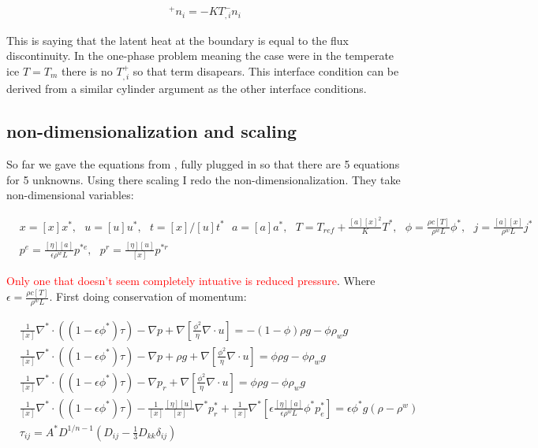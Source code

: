 \documentclass[a4paper,12pt]{article}
\begin{document}
\begin{align}
  [\rho^wL\phi(u_i-w_i) + \rho^wLj_i - KT_{,i}]^+ n_i = -KT_{,i}^- n_i
\end{align}

This is saying that the latent heat at the boundary is equal to the flux discontinuity. In the one-phase problem meaning the case were in the temperate ice $T=T_m$ there is no $T_{,i}^+$ so that term disapears. This interface condition can be derived from a similar cylinder argument as the other interface conditions. \cite{Andreucci}

\subsection{non-dimensionalization and scaling}

So far we gave the equations from \cite{schoof_2016}, fully plugged in so that there are 5 equations for 5 unknowns. Using there scaling I redo the non-dimensionalization. They take non-dimensional variables:

\begin{align*}
  & x = [x]x^*, ~~~ u = [u]u^*, ~~~ t = [x]/[u]t^* ~~~ a = [a]a^*, ~~~ T = T_{ref} + \frac{[a][x]^2}{K}T^*, ~~~ \phi = \frac{\rho c [T]}{\rho^w L}\phi^*, ~~~ j = \frac{[a][x]}{\rho^w L}j^*\\
  & p^e = \frac{[\eta][a]}{\epsilon\rho^wL}p^{*e}, ~~~ p^r = \frac{[\eta][u]}{[x]}p^{*r}
\end{align*}
  
\textcolor{red}{Only one that doesn't seem completely intuative is reduced pressure}. Where $\epsilon = \frac{\rho c [T]}{\rho^w L}$. First doing conservation of momentum:

\begin{align*}
  & \frac{1}{[x]}\nabla^* \cdot ((1-\epsilon\phi^*)\tau) - \nabla p + \nabla\left[\frac{\phi^2}{\eta}\nabla \cdot u\right] = -(1 - \phi) \rho g - \phi \rho_w g\\
  & \frac{1}{[x]}\nabla^* \cdot ((1-\epsilon\phi^*)\tau) - \nabla p + \rho g + \nabla\left[\frac{\phi^2}{\eta}\nabla \cdot u\right] = \phi\rho g - \phi \rho_w g\\
  & \frac{1}{[x]}\nabla^* \cdot ((1-\epsilon\phi^*)\tau) - \nabla p_r + \nabla\left[\frac{\phi^2}{\eta}\nabla \cdot u\right] = \phi\rho g - \phi \rho_w g\\
  & \frac{1}{[x]}\nabla^* \cdot ((1-\epsilon\phi^*)\tau) - \frac{1}{[x]}\frac{[\eta][u]}{[x]}\nabla^* p^*_r + \frac{1}{[x]}\nabla^*\left[\epsilon\frac{[\eta][a]}{\epsilon \rho^w L}\phi^*p_e^*\right] = \epsilon \phi^* g (\rho - \rho^w)\\
  & \tau_{ij} = A^*D^{1/n-1}\left(D_{ij} - \frac{1}{3}D_{kk}\delta_{ij}\right)
\end{align*}
\end{document}
